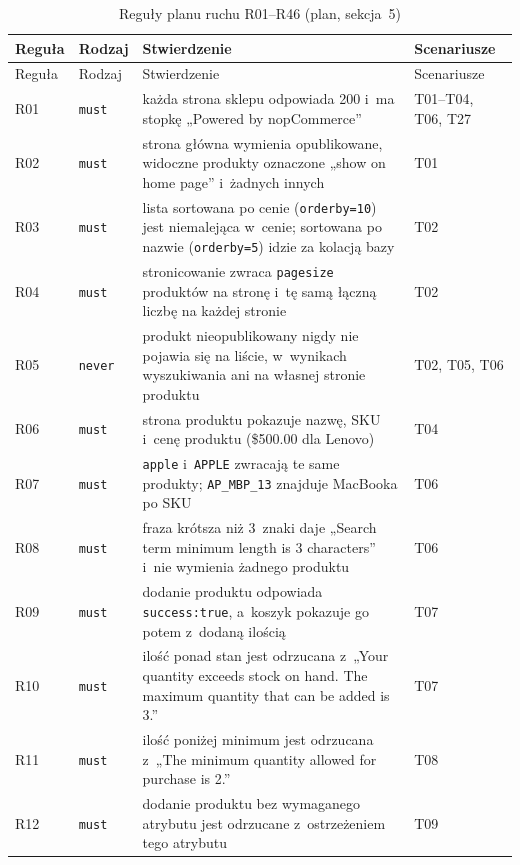 {\footnotesize
\begin{xltabular}{\linewidth}{@{}l l >{\raggedright\arraybackslash}X >{\raggedright\arraybackslash}p{2.2cm}@{}}
\caption{Reguły planu ruchu R01--R46 (plan, sekcja~5)}\label{tab:bench-reguly}\\
\toprule
Reguła & Rodzaj & Stwierdzenie & Scenariusze \\
\midrule
\endfirsthead
\toprule
Reguła & Rodzaj & Stwierdzenie & Scenariusze \\
\midrule
\endhead
\bottomrule
\endlastfoot
R01 & \texttt{must} & każda strona sklepu odpowiada 200 i~ma stopkę „Powered by nopCommerce” & T01--T04, T06, T27 \\
R02 & \texttt{must} & strona główna wymienia opublikowane, widoczne produkty oznaczone „show on home page” i~żadnych innych & T01 \\
R03 & \texttt{must} & lista sortowana po cenie (\texttt{orderby=10}) jest niemalejąca w~cenie; sortowana po nazwie (\texttt{orderby=5}) idzie za kolacją bazy & T02 \\
R04 & \texttt{must} & stronicowanie zwraca \texttt{pagesize} produktów na stronę i~tę samą łączną liczbę na każdej stronie & T02 \\
R05 & \texttt{never} & produkt nieopublikowany nigdy nie pojawia się na liście, w~wynikach wyszukiwania ani na własnej stronie produktu & T02, T05, T06 \\
R06 & \texttt{must} & strona produktu pokazuje nazwę, SKU i~cenę produktu (\$500.00 dla Lenovo) & T04 \\
R07 & \texttt{must} & \texttt{apple} i~\texttt{APPLE} zwracają te same produkty; \texttt{AP\_MBP\_13} znajduje MacBooka po SKU & T06 \\
R08 & \texttt{must} & fraza krótsza niż 3~znaki daje „Search term minimum length is 3 characters” i~nie wymienia żadnego produktu & T06 \\
R09 & \texttt{must} & dodanie produktu odpowiada \texttt{\textquotedbl{}success\textquotedbl{}:true}, a~koszyk pokazuje go potem z~dodaną ilością & T07 \\
R10 & \texttt{must} & ilość ponad stan jest odrzucana z~„Your quantity exceeds stock on hand. The maximum quantity that can be added is 3.” & T07 \\
R11 & \texttt{must} & ilość poniżej minimum jest odrzucana z~„The minimum quantity allowed for purchase is 2.” & T08 \\
R12 & \texttt{must} & dodanie produktu bez wymaganego atrybutu jest odrzucane z~ostrzeżeniem tego atrybutu & T09 \\

\end{xltabular}}
